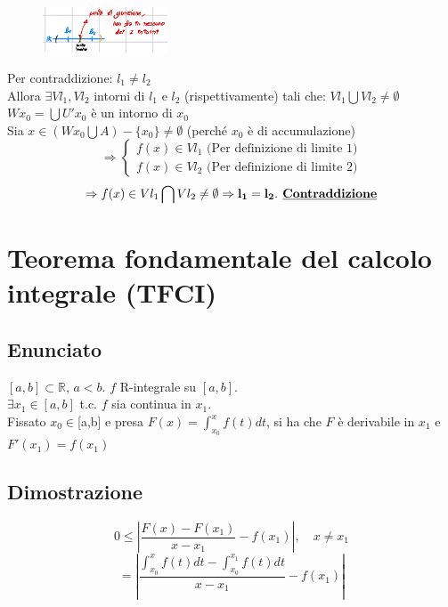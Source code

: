 \documentclass{article}
\newcommand{\R}{\mathbb{R}}
\begin{document}
\begin{flushleft}
\begin{figure}[h]
    \centering
    \includegraphics[width=10em]{./images/unicitaLimite.PNG}
\end{figure}

Per contraddizione: $l_1 \neq l_2$
\\Allora $\exists Vl_1, Vl_2$ intorni di $l_1$ e $l_2$ (rispettivamente) tali che: $Vl_1 \bigcup Vl_2 \neq \emptyset$
\\$Wx_0 = \bigcup U'x_0$ è un intorno di $x_0$
\\Sia $x \in(Wx_0 \bigcup A) - \{x_0\} \neq \emptyset$ (perché $x_0$ è di accumulazione)
\[
    \Rightarrow
    \begin{cases}
        f(x) \in Vl_1 \text{  (Per definizione di limite 1)}\\
        f(x) \in Vl_2 \text{  (Per definizione di limite 2)}
    \end{cases}
\]
\[
    \Rightarrow f(x) \in Vl_1 \bigcap Vl_2 \neq \emptyset \Rightarrow \mathbf{l_1 = l_2}. \mathbf{\textbf{ \underline{Contraddizione}}}
\]

\section{Teorema fondamentale del calcolo integrale (TFCI)}
\subsection{Enunciato}
$[a,b] \subset \R$, $a < b$. $f$ R-integrale su $[a,b]$.
\\$\exists x_1 \in [a,b]$ t.c. $f$ sia continua in $x_1$.
\\Fissato $x_0 \in $[a,b] e presa $F(x) = \int_{x_0}^{x}f(t)dt$, si ha che $F$ è derivabile in $x_1$ e $F'(x_1)=f(x_1)$
\subsection{Dimostrazione}
\[ 0 \leq \left| \frac{F(x) - F(x_1)}{x - x_1} - f(x_1) \right|, \quad x \neq x_1 \]
\[ = \left| \frac{\int_{x_0}^{x}f(t)dt-\int_{x_0}^{x_1}f(t)dt}{x - x_1} - f(x_1) \right|\]


\end{flushleft}
\end{document}
